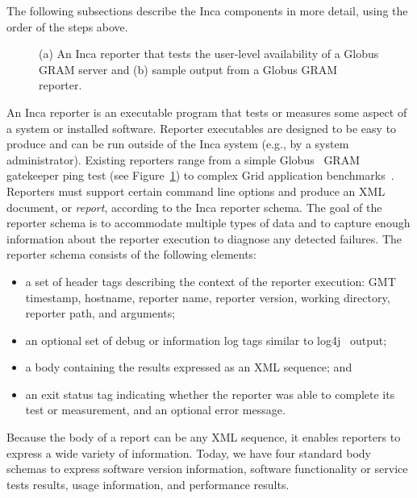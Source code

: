 \documentclass[times,10pt,twocolumn]{article}
\begin{document}
\noindent The following subsections describe the Inca components in more
detail, using the order of the steps above.


\lstset{
  basicstyle=\scriptsize\ttfamily, 
  frame=single,
  keywordstyle=\textbf, 
  identifierstyle=, 
  commentstyle=\scriptsize\ttfamily, 
  stringstyle=\ttfamily, 
  numbers=left, 
  numberstyle=\scriptsize,
  stepnumber=2,
  firstnumber=1,
  showstringspaces=false} 
\begin{figure}[tbp]
\lstset{language=Perl} 
\subfigure[]{}
\subfigure[]{}
\caption{\label{pingReporter}(a) An Inca reporter that tests the user-level
availability of a Globus GRAM server and (b) sample output from a Globus GRAM 
reporter.}
\end{figure}

An Inca reporter is an executable program that tests or measures some aspect
of a system or installed software.   Reporter executables are designed to be
easy to produce and can be run outside of the Inca system (e.g., by a system
administrator).  Existing reporters range from a simple Globus~\cite{globus}
GRAM gatekeeper ping test (see Figure~\ref{pingReporter})
to complex Grid application benchmarks~\cite{grasp}.  Reporters must
support certain command line options and produce an XML document, or
\emph{report},
according to the Inca reporter schema.  The goal of the reporter schema is to
accommodate multiple types of data and to capture enough information about the
reporter execution to diagnose any detected failures.  The reporter schema
consists of the following elements: 

\begin{itemize}
\item a set of header tags describing the context of the reporter
execution:  GMT timestamp, hostname, reporter name, reporter version, working
directory, reporter path, and arguments;
\item an optional set of debug or information log tags similar to log4j~\cite{log4j} output;
\item a body containing the results expressed as an XML sequence; and
\item an exit status tag
indicating whether the reporter was able to complete its test or measurement,
and an optional error message.  
\end{itemize} 
\noindent Because the body of a report can be any XML sequence, it enables
reporters to express a wide variety of information.  Today, we have four
standard body schemas to express software version information, software
functionality or service tests results, usage information, and performance
results.  
\end{document}
